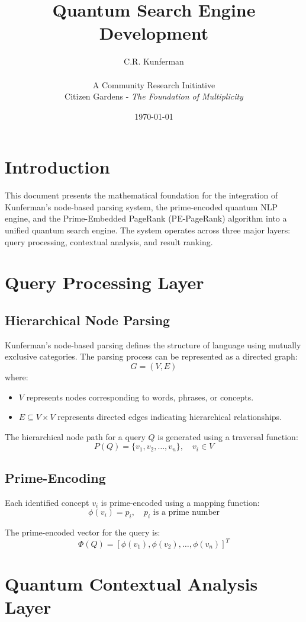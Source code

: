 \documentclass{article}
\title{Quantum Search Engine Development}
\author{C.R. Kunferman\\ \\ A Community Research Initiative\\ \large Citizen Gardens - \textit{The Foundation of Multiplicity}}
\date{\today}
\theoremstyle{plain}
\theoremstyle{claimstyle}
\begin{document}
\maketitle

\section{Introduction}
This document presents the mathematical foundation for the integration of Kunferman's node-based parsing system, the prime-encoded quantum NLP engine, and the Prime-Embedded PageRank (PE-PageRank) algorithm into a unified quantum search engine. The system operates across three major layers: query processing, contextual analysis, and result ranking.

\section{Query Processing Layer}

\subsection{Hierarchical Node Parsing}
Kunferman's node-based parsing defines the structure of language using mutually exclusive categories. The parsing process can be represented as a directed graph:
\[
G = (V, E)
\]
where:
\begin{itemize}
    \item \( V \) represents nodes corresponding to words, phrases, or concepts.
    \item \( E \subseteq V \times V \) represents directed edges indicating hierarchical relationships.
\end{itemize}

The hierarchical node path for a query \(Q\) is generated using a traversal function:
\[
P(Q) = \{ v_1, v_2, \ldots, v_n \}, \quad v_i \in V
\]

\subsection{Prime-Encoding}
Each identified concept \(v_i\) is prime-encoded using a mapping function:
\[
\phi(v_i) = p_i, \quad p_i \text{ is a prime number}
\]

The prime-encoded vector for the query is:
\[
\Phi(Q) = [\phi(v_1), \phi(v_2), \ldots, \phi(v_n)]^T
\]

\section{Quantum Contextual Analysis Layer}
\end{document}
